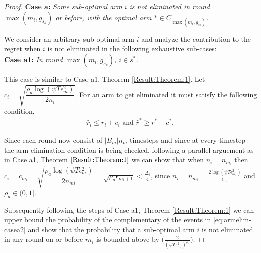 \begin{proof}
\textbf{Case a:} \textit{Some sub-optimal arm ${i}$ is not eliminated in round $\max(m_{i},g_{s_{k}})$ or before, with the optimal arm ${*}\in C_{\max(m_{i},g_{s_{k}})}$.}



We consider an arbitrary sub-optimal arm ${i}$ and analyze the contribution to the regret when $i$ is not eliminated in the following exhaustive sub-cases:\\
\textbf{Case a1:} \textit{In round $\max(m_{i},g_{s_{k}})$, ${i} \in s^{*}$.}

This case is similar to Case a1, Theorem \ref{Result:Theorem:1}. Let $c_{i}=\sqrt{\dfrac{\rho_{a}\log{(\psi T\epsilon_{m}^{2})}}{2 n_{i}}}$. For an arm to get eliminated it must satisfy the following condition,
\begin{align}
\hat{r}_{i}  \le r_{i} + c_{i} \text{ and } 
\hat{r}^{*}\geq  r^{*} - c^{*}, \label{eq:armelim-casea2}
\end{align}

Since each round now consist of $|B_{m}|n_{m}$ timesteps and since at every timestep the arm elimination condition is being checked, following a parallel arguement as in Case a1, Theorem $\ref{Result:Theorem:1}$ we can show that when $n_{i} = n_{m_{i}}$ then \\ $c_{i} = c_{m_{i}} = \sqrt{\dfrac{\rho_{a}\log{(\psi T\epsilon_{m}^{2})}}{2 n_{m{i}}}} = \sqrt{\rho_{a}\epsilon_{m_{i}+1}} < \frac{\Delta_{i}}{4}$, since $n_{i} = n_{m_{i}}=\frac{2\log{(\psi T\epsilon_{m_{i}}^{2})}}{\epsilon_{m_{i}}}$ and $\rho_{a}\in (0,1]$.

Subsequently following the steps of Case a1, Theorem \ref{Result:Theorem:1} we can upper bound the probability of the complementary of the events in \ref{eq:armelim-casea2} and show that the probability that a sub-optimal arm ${i}$ is not eliminated in any round on or before $m_{i}$ is bounded above by  $\bigg(\frac{2}{(\psi T\epsilon_{m_{i}}^{2})^{\rho_{a}}}\bigg)$.




\end{proof}
